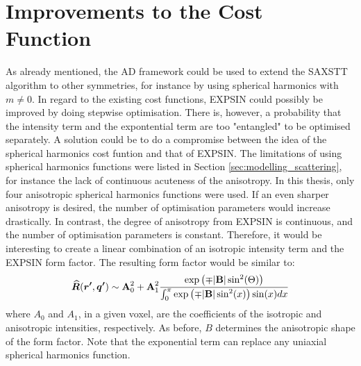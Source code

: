 \section{Improvements to the Cost Function}
As already mentioned, the AD framework could be used to extend the SAXSTT algorithm to other symmetries, for instance by using spherical harmonics with $m \neq 0$.
In regard to the existing cost functions, EXPSIN could possibly be improved by doing stepwise optimisation.
There is, however, a probability that the intensity term and the expontential term are too "entangled" to be optimised separately.
A solution could be to do a compromise between the idea of the spherical harmonics cost funtion and that of EXPSIN.
The limitations of using spherical harmonics functions were listed in Section \ref{sec:modelling_scattering}, for instance the lack of continuous acuteness of the anisotropy.
In this thesis, only four anisotropic spherical harmonics functions were used. If an even sharper anisotropy is desired, the number of optimisation parameters would increase drastically.
In contrast, the degree of anisotropy from EXPSIN is continuous, and the number of optimisation parameters is constant.
Therefore, it would be interesting to create a linear combination of an isotropic intensity term and the EXPSIN form factor.
The resulting form factor would be similar to:
\begin{equation}
    \label{eq:form_factor_linear_combination}
    \bm{\widehat{R}}(\bm{r'}, \bm{q'}) \sim \bm{\mathrm{A}}_{0}^{2} + \bm{\mathrm{A}}_{1}^{2} \frac{\exp\left(\mp |\bm{\mathrm{B}}| \sin^2(\mathrm{\boldsymbol{\Theta}}) \right)} {\int_{0}^{\pi} \exp\left( \mp |\bm{\mathrm{B}}| \sin^{2}(x) \right) \sin(x) dx}
\end{equation}
\noindent
where $A_{0}$ and $A_{1}$, in a given voxel, are the coefficients of the isotropic and anisotropic intensities, respectively. As before, $B$ determines the anisotropic shape of the form factor.
Note that the exponential term can replace any uniaxial spherical harmonics function.